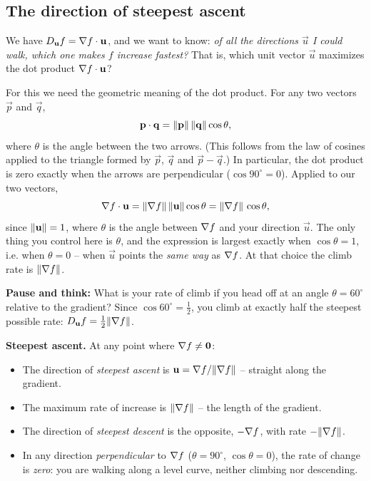 \subsection{The direction of steepest ascent}

We have $D_{\mathbf{u}} f = \nabla f \cdot \mathbf{u}$, and we want to know: \emph{of all the
directions $\vec u$ I could walk, which one makes $f$ increase fastest?} That is,
which unit vector $\vec u$ maximizes the dot product $\nabla f \cdot \mathbf{u}$?

For this we need the geometric meaning of the dot product. For any two vectors
$\vec p$ and $\vec q$,
\[
  \mathbf{p}\cdot\mathbf{q} = \lVert\mathbf{p}\rVert\,\lVert\mathbf{q}\rVert\cos\theta,
\]
where $\theta$ is the angle between the two arrows. (This follows from the law of
cosines applied to the triangle formed by $\vec p$, $\vec q$ and $\vec p-\vec q$.)
In particular, the dot product is zero exactly when the arrows are perpendicular
($\cos 90^\circ=0$). Applied to our two vectors,
\[
  \nabla f \cdot \mathbf{u} = \lVert\nabla f\rVert\,\lVert\mathbf{u}\rVert\cos\theta
  = \lVert\nabla f\rVert\,\cos\theta,
\]
since $\lVert\mathbf{u}\rVert=1$, where $\theta$ is the angle between $\nabla f$ and your
direction $\vec u$. The only thing you control here is $\theta$, and the
expression is largest exactly when $\cos\theta=1$, i.e. when $\theta=0$ -- when
$\vec u$ points the \emph{same way} as $\nabla f$. At that choice the climb rate is
$\lVert\nabla f\rVert$.

\textbf{Pause and think:} What is your rate of climb if you head off at an angle $\theta = 60^\circ$ relative to the gradient? Since $\cos 60^\circ = \tfrac{1}{2}$, you climb at exactly half the steepest possible rate: $D_{\mathbf{u}} f = \tfrac{1}{2}\lVert\nabla f\rVert$.

\begin{focusbox}
\textbf{Steepest ascent.} At any point where $\nabla f\neq \mathbf{0}$:
\begin{itemize}
\item The direction of \emph{steepest ascent} is $\mathbf{u} = \nabla f / \lVert\nabla
f\rVert$ -- straight along the gradient.
\item The maximum rate of increase is $\lVert\nabla f\rVert$ -- the length of the
gradient.
\item The direction of \emph{steepest descent} is the opposite, $-\nabla f$, with
rate $-\lVert\nabla f\rVert$.
\item In any direction \emph{perpendicular} to $\nabla f$ ($\theta=90^\circ$,
$\cos\theta=0$), the rate of change is \emph{zero}: you are walking along a level
curve, neither climbing nor descending.
\end{itemize}
\end{focusbox}

